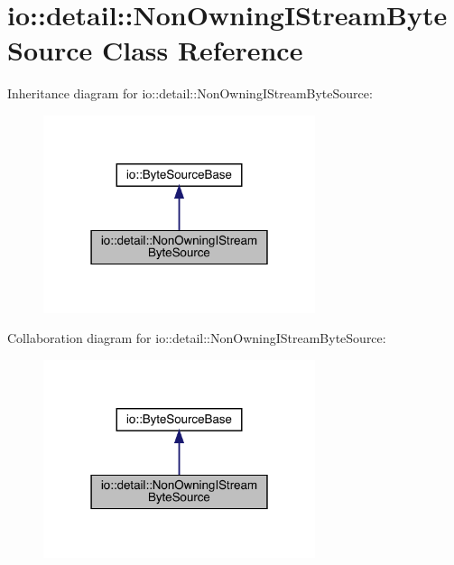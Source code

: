 \hypertarget{classio_1_1detail_1_1_non_owning_i_stream_byte_source}{}\section{io\+:\+:detail\+:\+:Non\+Owning\+I\+Stream\+Byte\+Source Class Reference}
\label{classio_1_1detail_1_1_non_owning_i_stream_byte_source}


Inheritance diagram for io\+:\+:detail\+:\+:Non\+Owning\+I\+Stream\+Byte\+Source\+:
\nopagebreak
\begin{figure}[H]
\begin{center}
\leavevmode
\includegraphics[width=226pt]{classio_1_1detail_1_1_non_owning_i_stream_byte_source__inherit__graph}
\end{center}
\end{figure}


Collaboration diagram for io\+:\+:detail\+:\+:Non\+Owning\+I\+Stream\+Byte\+Source\+:
\nopagebreak
\begin{figure}[H]
\begin{center}
\leavevmode
\includegraphics[width=226pt]{classio_1_1detail_1_1_non_owning_i_stream_byte_source__coll__graph}
\end{center}
\end{figure}
